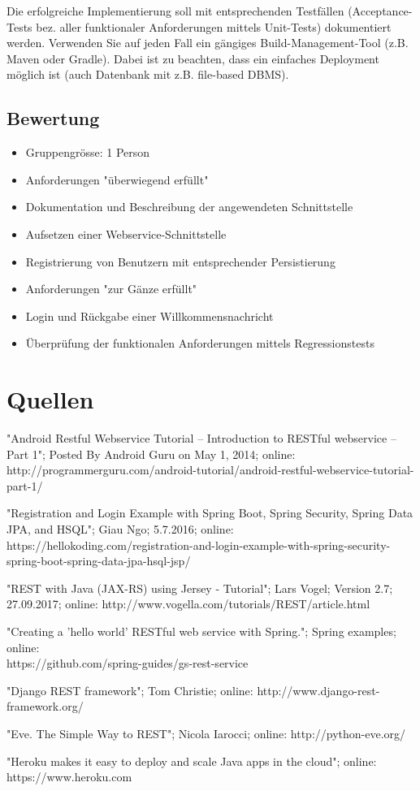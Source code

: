         Die erfolgreiche Implementierung soll mit entsprechenden Testfällen (Acceptance-Tests bez. aller funktionaler Anforderungen mittels Unit-Tests) dokumentiert werden. Verwenden Sie auf jeden Fall ein gängiges Build-Management-Tool (z.B. Maven oder Gradle). Dabei ist zu beachten, dass ein einfaches Deployment möglich ist (auch Datenbank mit z.B. file-based DBMS).
    
    \newpage 
    
    \subsection{Bewertung}
        \begin{itemize}
            \item Gruppengrösse: 1 Person
            \item Anforderungen "überwiegend erfüllt"
            \item Dokumentation und Beschreibung der angewendeten Schnittstelle
            \item Aufsetzen einer Webservice-Schnittstelle
            \item Registrierung von Benutzern mit entsprechender Persistierung
            \item Anforderungen "zur Gänze erfüllt"
            \item Login und Rückgabe einer Willkommensnachricht
            \item Überprüfung der funktionalen Anforderungen mittels Regressionstests
        \end{itemize}

\section{Quellen}
    "Android Restful Webservice Tutorial – Introduction to RESTful webservice – Part 1"; 
    Posted By Android Guru on May 1, 2014; online: http://programmerguru.com/android-tutorial/android-restful-webservice-tutorial-part-1/
    
    "Registration and Login Example with Spring Boot, Spring Security, Spring Data JPA, and HSQL"; Giau Ngo; 5.7.2016; online: https://hellokoding.com/registration-and-login-example-with-spring-security-spring-boot-spring-data-jpa-hsql-jsp/
    
    "REST with Java (JAX-RS) using Jersey - Tutorial"; Lars Vogel; Version 2.7; 27.09.2017; online: http://www.vogella.com/tutorials/REST/article.html
    
    "Creating a 'hello world' RESTful web service with Spring."; Spring examples; online:\\ https://github.com/spring-guides/gs-rest-service
    
    "Django REST framework"; Tom Christie; online: http://www.django-rest-framework.org/
    
    "Eve. The Simple Way to REST"; Nicola Iarocci; online: http://python-eve.org/
    
    "Heroku makes it easy to deploy and scale Java apps in the cloud"; online: https://www.heroku.com

\newpage
